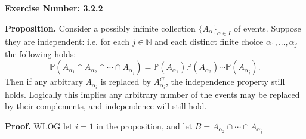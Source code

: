 \documentclass{article}
\begin{document}
\noindent \textbf{Exercise Number: 3.2.2}  %

\bigskip

\noindent \textbf{Proposition.} Consider a possibly infinite collection $\{A_{\alpha}\}_{\alpha \in I}$
of events. Suppose they are independent: i.e. for each $j \in \mathbb{N}$ and each distinct finite choice $\alpha_1, ..., \alpha_j$ the following holds: \[\mathbb{P}(A_{\alpha_1} \cap A_{\alpha_2} \cap \cdots \cap A_{\alpha_j}) = \mathbb{P} (A_{\alpha_1}) \mathbb{P} (A_{\alpha_2}) \cdots \mathbb{P}( A_{\alpha_j}).\] Then if any arbitrary $A_{\alpha_i}$ is replaced by $A_{\alpha_i}^C$, the independence property still holds. Logically this implies any arbitrary number of the events may be replaced by their complements, and independence will still hold. 

\bigskip

\noindent \textbf{Proof.} WLOG let $i = 1$ in the proposition, and let $B =  A_{\alpha_2} \cap \cdots \cap A_{\alpha_j}$
\end{document}
